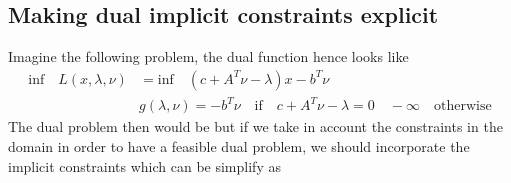 \subsection{Making dual implicit constraints explicit}
Imagine the following problem,
the dual function hence looks like
\begin{equation}
\begin{aligned}
\text{inf} \quad L(x,\lambda,\nu)&=\text{inf} \quad (c+A^T\nu-\lambda)x - b^T\nu \\
& g(\lambda,\nu) = -b^T \nu \quad \text{if} \quad c+A^T\nu-\lambda = 0 \quad -\infty \quad \text{otherwise}
\end{aligned}
\end{equation}
The dual problem then would be
but if we take in account the constraints in the domain in order to have a feasible dual problem, we should incorporate the implicit constraints
which can be simplify as 
